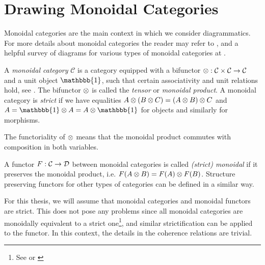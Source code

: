 \section{Drawing Monoidal Categories}
\label{sec:monoidal-cat}

Monoidal categories are the main context in which we consider diagrammatics. For more details about monoidal categories the reader may refer to \cite{tensor-categories}, and a helpful survey of diagrams for various types of monoidal categories at \cite{selinger-survey-of-graphical-monoidal-categories}.

\begin{definition}
    A \textit{monoidal category} $\mathcal{C}$ is a category equipped with a bifunctor $\otimes: \mathcal{C} \times \mathcal{C} \to \mathcal{C}$ and a unit object $\mathbbb{1}$, such that certain associativity and unit relations hold, see \cite[Definition 2.1.1, 2.2.8]{tensor-categories}. The bifunctor $\otimes$ is called the \textit{tensor} or \textit{monoidal product}. A monoidal category is \textit{strict} if we have equalities $A \otimes (B \otimes C) = (A \otimes B) \otimes C$ and $A = \mathbbb{1} \tensor A = A \tensor \mathbbb{1}$ for objects and similarly for morphisms.
\end{definition}

The functoriality of $\otimes$ means that the monoidal product commutes with composition in both variables.

\begin{definition}
    A functor $F: \mathcal{C} \to \mathcal{D}$ between monoidal categories is called \textit{(strict) monoidal} if it preserves the monoidal product, i.e. $F(A \otimes B) = F(A) \otimes F(B)$. Structure preserving functors for other types of categories can be defined in a similar way.
\end{definition}

For this thesis, we will assume that monoidal categories and monoidal functors are strict. This does not pose any problems since all monoidal categories are monoidally equivalent to a strict one\footnote{See \cite[\nopp VII.2]{maclane-category-theory} or \cite[Thm 2.8.5]{tensor-categories}}, and similar strictification can be applied to the functor. In this context, the details in the coherence relations are trivial.

